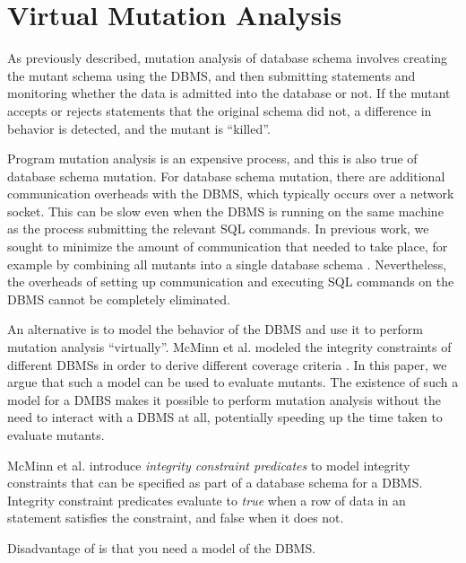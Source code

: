 
\section{Virtual Mutation Analysis}
\label{sec:virtual-mutation-analysis}

As previously described, mutation analysis of database schema involves creating the mutant schema using the DBMS, and then submitting \INSERT statements and monitoring whether the data is admitted into the database or not. If the mutant accepts or rejects \INSERT statements that the original schema did not, a difference in behavior is detected, and the mutant is ``killed''.

Program mutation analysis is an expensive process, and this is also true of database schema mutation. For database schema mutation, there are additional communication overheads with the DBMS, which typically occurs over a network socket. This can be slow even when the DBMS is running on the same machine as the process submitting the relevant SQL commands. 
In previous work, we sought to minimize the amount of communication that needed to take place, for example by combining all mutants into a single database schema \cite{Wright2013}. 
Nevertheless, the overheads of setting up communication and executing SQL commands on the DBMS cannot be completely eliminated.

An alternative is to model the behavior of the DBMS and use it to perform mutation analysis ``virtually''. McMinn et al. modeled the integrity constraints of different DBMSs in order to derive different coverage criteria \cite{McMinn2015}. In this paper, we argue that such a model can be used to evaluate mutants. The existence of such a model for a DMBS makes it possible to perform mutation analysis without the need to interact with a DBMS at all, potentially speeding up the time taken to evaluate mutants.

McMinn et al. introduce {\it integrity constraint predicates} to model integrity constraints that can be specified as part of a database schema for a DBMS. Integrity constraint predicates evaluate to {\it true} when a row of data in an \INSERT statement satisfies the constraint, and false when it does not.




Disadvantage of \VMA is that you need a model of the DBMS.

